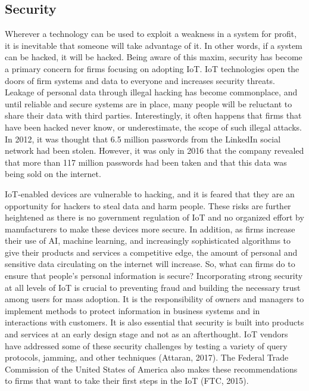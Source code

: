 \documentclass[
  letterpaper,
  DIV=11,
  numbers=noendperiod]{scrreprt}
\begin{document}
\hypertarget{security}{%
\subsection{Security}\label{security}}

Wherever a technology can be used to exploit a weakness in a system for
profit, it is inevitable that someone will take advantage of it. In
other words, if a system can be hacked, it will be hacked. Being aware
of this maxim, security has become a primary concern for firms focusing
on adopting IoT. IoT technologies open the doors of firm systems and
data to everyone and increases security threats. Leakage of personal
data through illegal hacking has become commonplace, and until reliable
and secure systems are in place, many people will be reluctant to share
their data with third parties. Interestingly, it often happens that
firms that have been hacked never know, or underestimate, the scope of
such illegal attacks. In 2012, it was thought that 6.5 million passwords
from the LinkedIn social network had been stolen. However, it was only
in 2016 that the company revealed that more than 117 million passwords
had been taken and that this data was being sold on the internet.

IoT-enabled devices are vulnerable to hacking, and it is feared that
they are an opportunity for hackers to steal data and harm people. These
risks are further heightened as there is no government regulation of IoT
and no organized effort by manufacturers to make these devices more
secure. In addition, as firms increase their use of AI, machine
learning, and increasingly sophisticated algorithms to give their
products and services a competitive edge, the amount of personal and
sensitive data circulating on the internet will increase. So, what can
firms do to ensure that people's personal information is secure?
Incorporating strong security at all levels of IoT is crucial to
preventing fraud and building the necessary trust among users for mass
adoption. It is the responsibility of owners and managers to implement
methods to protect information in business systems and in interactions
with customers. It is also essential that security is built into
products and services at an early design stage and not as an
afterthought. IoT vendors have addressed some of these security
challenges by testing a variety of query protocols, jamming, and other
techniques (Attaran, 2017). The Federal Trade Commission of the United
States of America also makes these recommendations to firms that want to
take their first steps in the IoT (FTC, 2015).
\end{document}
